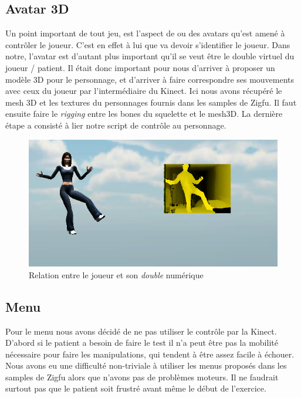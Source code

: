 \subsection{Avatar 3D}   
Un point important de tout jeu, est l'aspect de ou des avatars qu'est amené à contrôler le joueur. C'est en effet à lui que va devoir s'identifier le joueur. Dans notre, l'avatar est d'autant plus important qu'il se veut être le double virtuel du joueur / patient. Il était donc important pour nous d'arriver à proposer un modèle 3D pour le personnage, et d'arriver à faire correspondre ses mouvements avec ceux du joueur par l'intermédiaire du Kinect. Ici nous avons récupéré le mesh 3D et les textures du personnages fournis dans les samples de Zigfu. Il faut ensuite faire le \textit{rigging} entre les bones du squelette et le mesh3D. La dernière étape a consisté à lier notre script de contrôle au personnage.
\begin{figure}
\begin{center}
  \includegraphics[scale=1]{../images/avatar3D.png} \caption{Relation entre le joueur et son \textit{double} numérique}
\end{center}
\end{figure}

    
\subsection{Menu}

Pour le menu nous avons décidé de ne pas utiliser le contrôle par la Kinect.
D'abord si le patient a besoin de faire le test il n'a peut être pas la
mobilité nécessaire pour faire les manipulations, qui tendent à être assez 
facile à échouer. Nous avons eu une difficulté non-triviale à utiliser les menus
proposés dans les samples de Zigfu alors que n'avons pas de problèmes moteurs.
Il ne faudrait surtout pas que le patient soit frustré avant même le début de
l'exercice.
    
